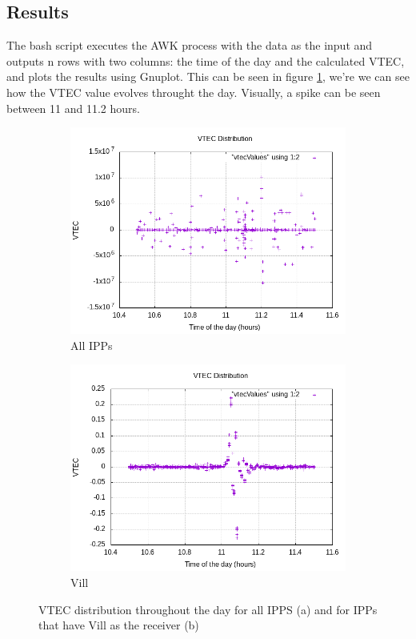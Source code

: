 \subsection{Results}

The bash script executes the AWK process with the data as the input and outputs n rows with two columns: the time of the day and the calculated VTEC, and plots the results using Gnuplot.
This can be seen in figure \ref{fig:vtecDistribution}, we're we can see how the VTEC value evolves throught the day. Visually, a spike can be seen between 11 and 11.2 hours.

\begin{figure}[!htb]
	\begin{subfigure}[b]{0.5\textwidth}
		\includegraphics[width=\linewidth]{images/ch4/vtecDistributionGeneral.png}
		\caption{All IPPs}
	\end{subfigure}
	\hfill
	\begin{subfigure}[b]{0.5\textwidth}
		\includegraphics[width=\linewidth]{images/ch4/vtecDistributionVill.png}
		\caption{Vill}
	\end{subfigure}
	\caption{VTEC distribution throughout the day for all IPPS (a) and for IPPs that have Vill as the receiver (b)}
	\label{fig:vtecDistribution}
\end{figure}

